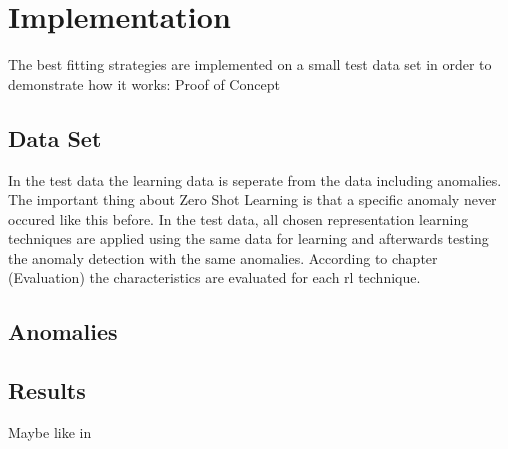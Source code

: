 \section{Implementation}\label{implementation}
The best fitting strategies are implemented on a small test data set in order to demonstrate how it works: Proof of Concept\\
\subsection{Data Set}
In the test data the learning data is seperate from the data including anomalies. The important thing about Zero Shot Learning is that a specific anomaly never occured like this before. In the test data, all chosen representation learning techniques are applied using the same data for learning and afterwards testing the anomaly detection with the same anomalies. According to chapter (Evaluation) the characteristics are evaluated for each rl technique.\\
\subsection{Anomalies}
\subsection{Results}
Maybe like in 
